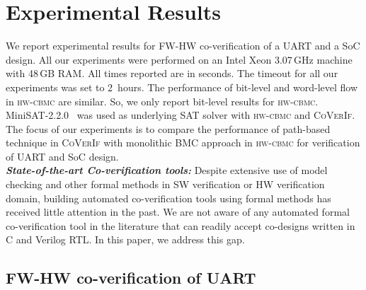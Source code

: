 \documentclass[sigconf]{acmart}
\newcommand{\tool}[1]{\textsc{#1}\xspace}
\newcommand{\hwcbmcv}{\tool{hw-cbmc}}
\newcommand{\verifox}{\tool{CoVerIf}}
\begin{document}
\section{Experimental Results}
%
We report experimental results for FW-HW co-verification of a UART  and a
SoC design.  All our experiments were performed on an Intel Xeon 3.07\,GHz
machine with 48\,GB RAM.  All times reported are in seconds.  The timeout 
for all our experiments was set to 2~hours.  The performance of bit-level 
and word-level flow in \hwcbmcv are similar. So, we only report bit-level 
results for \hwcbmcv.  MiniSAT-2.2.0~\cite{DBLP:conf/sat/EenB05} was used 
as underlying SAT solver with \hwcbmcv and \verifox.  The focus of our 
experiments is to compare the performance of path-based technique in \verifox 
with monolithic BMC approach in \hwcbmcv for verification of UART and SoC design.  
\\ 
%

\textit{\textbf{State-of-the-art Co-verification tools:}} 
%
Despite extensive use of model checking and other formal methods in 
SW verification or HW verification domain, building automated 
co-verification tools using formal methods has received 
little attention in the past.  We are not aware of any automated 
formal co-verification tool in the literature that can readily accept 
co-designs written in C and Verilog RTL. In this paper, we address this gap. 
%
\subsection{FW-HW co-verification of UART}
\end{document}
